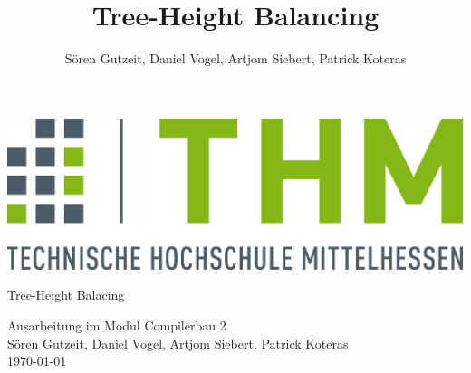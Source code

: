 \documentclass[12pt,a4paper,titlepage,oneside]{scrreprt}
\author{Sören Gutzeit, Daniel Vogel, Artjom Siebert, Patrick Koteras}
\title{Tree-Height Balancing}
\begin{document}
\begin{titlepage}
	\begin{center}
		\includegraphics[width=1.0\textwidth]{images/logo}\\
		\vspace{3cm}
		\begin{Huge}
			 Tree-Height Balacing
		\end{Huge} \linebreak
		Ausarbeitung im Modul Compilerbau 2 \\
		\vspace{3cm}
		Sören Gutzeit, Daniel Vogel, Artjom Siebert, Patrick Koteras \\
		\today
	\end{center}
\end{titlepage}

\newpage 
\thispagestyle{empty}
\quad
\newpage

\setcounter{page}{1}
\tableofcontents

\setcounter{last_roman}{\value{page}}
\newpage






\newpage 
\thispagestyle{empty}
\quad
\newpage

\setcounter{page}{\value{last_roman}}

\newpage

\newpage

\newpage

\end{document}
